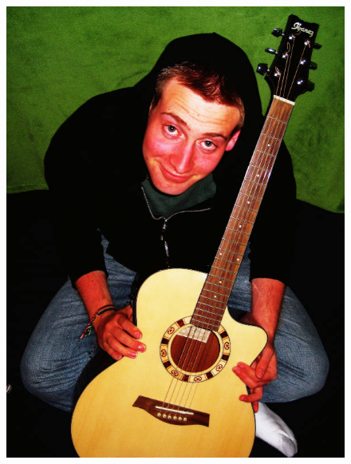 \begin{itemize}
\begin{figure}[ht]
\begin{minipage}[b]{0.47\linewidth}
\centering
\includegraphics[width=\textwidth]{Original.jpg}
\end{minipage}
\hspace{0.1cm}
\begin{minipage}[b]{0.47\linewidth}
\centering

\end{minipage}
\end{figure}
\end{itemize}
